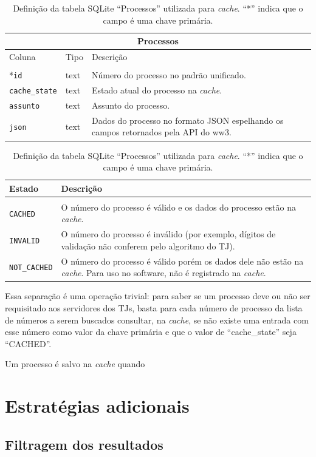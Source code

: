 \begin{table}[htb]
    \small
    \centering
    \begin{tabular}{llp{}}
        \toprule
        \multicolumn{3}{c}{Processos} \\
        \midrule
        Coluna & Tipo & Descrição \\
        \midrule \\
        *\texttt{id} & text & Número do processo no padrão unificado. \\
        \texttt{cache\_state} & text & Estado atual do processo na \textit{cache}. \\
        \texttt{assunto} & text & Assunto do processo. \\
        \texttt{json} & text & Dados do processo no formato JSON espelhando os campos retornados pela API do ww3. \\
        \bottomrule
    \end{tabular}
    \caption{%
        Definição da tabela SQLite ``Processos'' utilizada para \textit{cache}.
        ``*'' indica que o campo é uma chave primária.
    }
    \label{tbl:estrutura-tabela-processos}
\end{table}

\begin{table}[htb]
    \centering
    \begin{tabular}{lp{}}
        \toprule
        Estado & Descrição \\
        \midrule \\
        \texttt{CACHED} & O número do processo é válido e os dados do processo estão na \textit{cache}. \\
        \texttt{INVALID} & O número do processo é inválido (por exemplo, dígitos de validação não conferem pelo algoritmo do TJ). \\
        \texttt{NOT\_CACHED} & O número do processo é válido porém os dados dele não estão na \textit{cache}. Para uso no software, não é registrado na \textit{cache}. \\
        \bottomrule
    \end{tabular}
    \caption{%
        Definição da tabela SQLite ``Processos'' utilizada para \textit{cache}.
        ``*'' indica que o campo é uma chave primária.
    }
    \label{tbl:valores-coluna-state}
\end{table}

Essa separação é uma operação trivial: para saber se um processo deve ou não
ser requisitado aos servidores dos TJs, basta para cada número de processo da
lista de números a serem buscados consultar, na \textit{cache}, se não existe
uma entrada com esse número como valor da chave primária e que o valor de
``cache\_state'' seja ``CACHED''.

Um processo é salvo na \textit{cache} quando


\section{Estratégias adicionais}

\subsection{Filtragem dos resultados}
